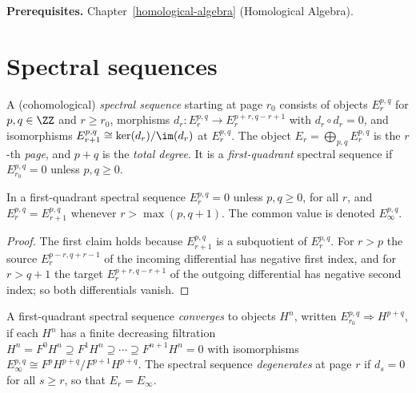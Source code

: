 \noindent\textbf{Prerequisites.} Chapter~\ref{homological-algebra} (Homological Algebra).

\section{Spectral sequences}\label{homological-algebra:section-definitions}

\begin{definition}\label{homological-algebra:definition-spectral-sequence}
A (cohomological) \emph{spectral sequence} starting at page $r_0$ consists of objects $E_r^{p,q}$ for $p, q \in \ZZ$
and $r \geq r_0$, morphisms $d_r \colon E_r^{p,q} \to E_r^{p+r, q-r+1}$ with $d_r \circ d_r = 0$, and isomorphisms
$E_{r+1}^{p,q} \cong \ker(d_r)/\im(d_r)$ at $E_r^{p,q}$. The object $E_r = \bigoplus_{p,q}E_r^{p,q}$ is the $r$-th \emph{page}, and
$p + q$ is the \emph{total degree}. It is a \emph{first-quadrant} spectral sequence if $E_{r_0}^{p,q} = 0$ unless $p, q \geq 0$.
\end{definition}

\begin{lemma}\label{homological-algebra:lemma-first-quadrant-stable}
In a first-quadrant spectral sequence $E_r^{p,q} = 0$ unless $p, q \geq 0$, for all $r$, and $E_r^{p,q} = E_{r+1}^{p,q}$ whenever
$r > \max(p, q + 1)$. The common value is denoted $E_\infty^{p,q}$.
\end{lemma}

\begin{proof}
The first claim holds because $E_{r+1}^{p,q}$ is a subquotient of $E_r^{p,q}$. For $r > p$ the source $E_r^{p-r, q+r-1}$ of the incoming
differential has negative first index, and for $r > q + 1$ the target $E_r^{p+r, q-r+1}$ of the outgoing differential has negative
second index; so both differentials vanish.
\end{proof}

\begin{definition}\label{homological-algebra:definition-convergence}
A first-quadrant spectral sequence \emph{converges} to objects $H^n$, written $E_{r_0}^{p,q} \Rightarrow H^{p+q}$, if each $H^n$ has a
finite decreasing filtration $H^n = F^0H^n \supseteq F^1H^n \supseteq \cdots \supseteq F^{n+1}H^n = 0$ with isomorphisms
$E_\infty^{p,q} \cong F^pH^{p+q}/F^{p+1}H^{p+q}$. The spectral sequence \emph{degenerates} at page $r$ if $d_s = 0$ for all
$s \geq r$, so that $E_r = E_\infty$.
\end{definition}

